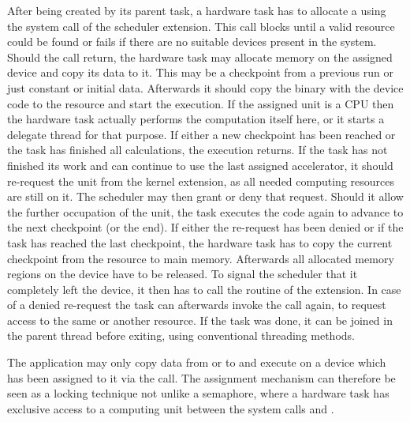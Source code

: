 After being created by its parent task, a hardware task has to allocate a \cu{} using the  system call of the scheduler extension. This call blocks until a valid resource could be found or fails if there are no suitable devices present in the system. Should the call return, the hardware task may allocate memory on the assigned device and copy its data to it. This may be a checkpoint from a previous run or just constant or initial data. Afterwards it should copy the binary with the device code to the resource and start the execution. If the assigned unit is a CPU then the hardware task actually performs the computation itself here, or it starts a delegate thread for that purpose. If either a new checkpoint has been reached or the task has finished all calculations, the execution returns. If the task has not finished its work and can continue to use the last assigned accelerator, it should re-request the unit from the kernel extension, as all needed computing resources are still on it. The scheduler may then grant or deny that request. Should it allow the further occupation of the unit, the task executes the code again to advance to the next checkpoint (or the end). If either the re-request has been denied or if the task has reached the last checkpoint, the hardware task has to copy the current checkpoint from the resource to main memory. Afterwards all allocated memory regions on the device have to be released. To signal the scheduler that it completely left the device, it then has to call the  routine of the extension. In case of a denied re-request the task can afterwards invoke the  call again, to request access to the same or another resource. If the task was done, it can be joined in the parent thread before exiting, using conventional threading methods.

The application may only copy data from or to and execute on a device which has been assigned to it via the  call. The assignment mechanism can therefore be seen as a locking technique not unlike a semaphore, where a hardware task has exclusive access to a computing unit between the system calls  and .

